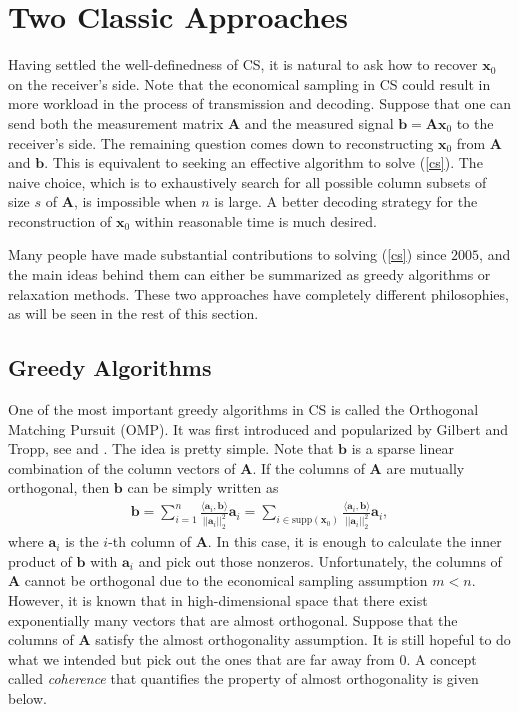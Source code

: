 \documentclass[11pt]{article}
\numberwithin{equation}{section}
\theoremstyle{plain}
\theoremstyle{definition}
\def\A{{\mathbf A}}
\def\x{{\mathbf x}}
\def\b{{\mathbf b}}
\def\a{{\mathbf a}}
\begin{document}
 
\section{Two Classic Approaches}\label{333}

Having settled the well-definedness of CS, it is natural to ask how to recover $\x_0$ on the receiver's side. Note that the economical sampling in CS could result in more workload in the process of transmission and decoding. Suppose that one can send both the measurement matrix $\A$ and the measured signal $\b=\A\x_0$ to the receiver's side. The remaining question comes down to reconstructing $\x_0$ from $\A$ and $\b$. This is equivalent to seeking an effective algorithm to solve (\ref{cs}). The naive choice, which is to exhaustively search for all possible column subsets of size $s$ of $\A$, is impossible when $n$ is large. A better decoding strategy for the reconstruction of $\x_0$ within reasonable time is much desired. 

Many people have made substantial  contributions to solving (\ref{cs}) since $2005$, and the main ideas behind them can either be summarized as greedy algorithms or relaxation methods. These two approaches have completely different philosophies, as will be seen in the rest of this section.

\subsection{Greedy Algorithms}

One of the most important greedy algorithms in CS is called the Orthogonal Matching Pursuit (OMP). It was first introduced and popularized by Gilbert and Tropp, see \cite{tropp2004greed} and \cite{tropp2007signal}. The idea is pretty simple. Note that $\b$ is a sparse linear combination of the column vectors of $\A$. If the columns of $\A$ are mutually orthogonal, then $\b$ can be simply written as 
\begin{align*}
\b=\sum_{i=1}^n\frac{\langle\a_i, \b\rangle}{||\a_i||_2^2}\a_i=\sum_{i\in\text{supp}(\x_0)}\frac{\langle\a_i, \b\rangle}{||\a_i||_2^2}\a_i, 
\end{align*} 
where $\a_i$ is the $i$-th column of $\A$. In this case, it is enough to calculate the inner product of $\b$ with $\a_i$ and pick out those nonzeros. Unfortunately, the columns of $\A$ cannot be orthogonal due to the economical sampling assumption $m<n$. However, it is known that in high-dimensional space that there exist exponentially many vectors that are almost orthogonal. Suppose that the columns of $\A$ satisfy the almost orthogonality assumption. It is still hopeful to do what we intended but pick out the ones that are far away from $0$. A concept called \emph{coherence} that quantifies the property of almost orthogonality is given below.
\end{document}
